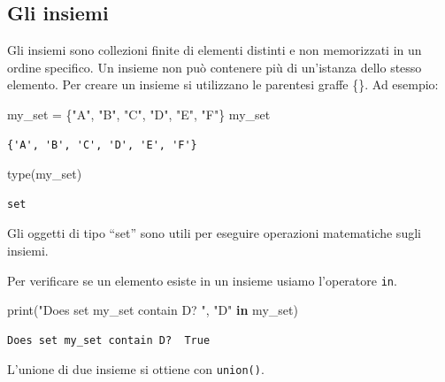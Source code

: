 \documentclass[
  letterpaper,
  krantz2]{{[}./krantz{]}}
\newenvironment{Shaded}{\begin{snugshade}}{\end{snugshade}}
\newcommand{\BuiltInTok}[1]{\textcolor[rgb]{0.00,0.23,0.31}{#1}}
\newcommand{\KeywordTok}[1]{\textcolor[rgb]{0.00,0.23,0.31}{\textbf{#1}}}
\newcommand{\NormalTok}[1]{\textcolor[rgb]{0.00,0.23,0.31}{#1}}
\newcommand{\OperatorTok}[1]{\textcolor[rgb]{0.37,0.37,0.37}{#1}}
\newcommand{\StringTok}[1]{\textcolor[rgb]{0.13,0.47,0.30}{#1}}
\begin{document}
\subsection{Gli insiemi}\label{gli-insiemi}

Gli insiemi sono collezioni finite di elementi distinti e non
memorizzati in un ordine specifico. Un insieme non può contenere più di
un'istanza dello stesso elemento. Per creare un insieme si utilizzano le
parentesi graffe \{\}. Ad esempio:

\begin{Shaded}
\begin{Highlighting}[]
\NormalTok{my\_set }\OperatorTok{=}\NormalTok{ \{}\StringTok{"A"}\NormalTok{, }\StringTok{"B"}\NormalTok{, }\StringTok{"C"}\NormalTok{, }\StringTok{"D"}\NormalTok{, }\StringTok{"E"}\NormalTok{, }\StringTok{"F"}\NormalTok{\}}
\NormalTok{my\_set}
\end{Highlighting}
\end{Shaded}

\begin{verbatim}
{'A', 'B', 'C', 'D', 'E', 'F'}
\end{verbatim}

\begin{Shaded}
\begin{Highlighting}[]
\BuiltInTok{type}\NormalTok{(my\_set)}
\end{Highlighting}
\end{Shaded}

\begin{verbatim}
set
\end{verbatim}

Gli oggetti di tipo ``set'' sono utili per eseguire operazioni
matematiche sugli insiemi.

Per verificare se un elemento esiste in un insieme usiamo l'operatore
\texttt{in}.

\begin{Shaded}
\begin{Highlighting}[]
\BuiltInTok{print}\NormalTok{(}\StringTok{"Does set my\_set contain D? "}\NormalTok{, }\StringTok{"D"} \KeywordTok{in}\NormalTok{ my\_set)}
\end{Highlighting}
\end{Shaded}

\begin{verbatim}
Does set my_set contain D?  True
\end{verbatim}

L'unione di due insieme si ottiene con \texttt{union()}.
\end{document}
